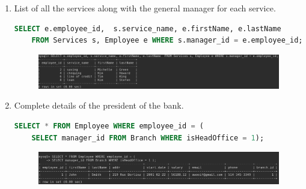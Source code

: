 \documentclass[letterpaper, 12pt]{article}
\begin{document}
\begin{enumerate}[label=\arabic*.]
\begin{figure}[H]
\end{figure}
  \item List of all the services along with the general manager for each service.
    \begin{lstlisting}[language=sql]
SELECT e.employee_id,  s.service_name, e.firstName, e.lastName 
	FROM Services s, Employee e WHERE s.manager_id = e.employee_id;
  \end{lstlisting}
\begin{figure}[H]
  \centering
  \includegraphics[scale=0.6]{images/Query_9.PNG}
\end{figure}
  \item Complete details of the president of the bank.
    \begin{lstlisting}[language=sql]
SELECT * FROM Employee WHERE employee_id = (
	SELECT manager_id FROM Branch WHERE isHeadOffice = 1);
  \end{lstlisting}
\begin{figure}[H]
  \centering
  \includegraphics[scale=0.45]{images/query_10.png}
\end{figure}

\end{enumerate}
\end{document}
